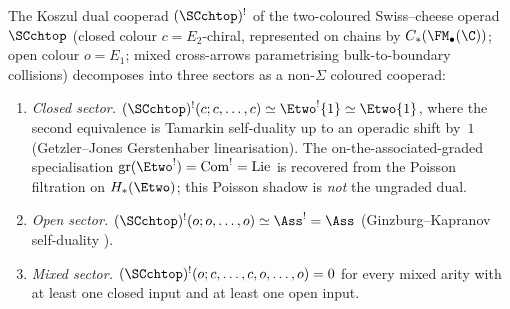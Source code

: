 \begin{proposition}
\label{prop:sc-koszul-dual-three-sectors}
The Koszul dual cooperad $(\SCchtop)^{!}$ of the two-coloured
Swiss--cheese operad $\SCchtop$ (closed colour $c = E_2$-chiral,
represented on chains by $C_\ast(\FM_\bullet(\C))$; open colour
$o = E_1$; mixed cross-arrows parametrising bulk-to-boundary
collisions) decomposes into three sectors as a non-$\Sigma$
coloured cooperad:
\begin{enumerate}[label=\textup{(\roman*)}]
\item \emph{Closed sector.} $(\SCchtop)^{!}(c;c,\ldots,c) \simeq
\Etwo^{!}\{1\} \simeq \Etwo\{1\}$, where the second equivalence
is Tamarkin self-duality \cite{Tam03,LV12} up to an operadic
shift by~$1$ (Getzler--Jones Gerstenhaber linearisation).
The on-the-associated-graded specialisation
$\mathrm{gr}(\Etwo^{!}) = \operatorname{Com}^! = \operatorname{Lie}$
is recovered from the Poisson filtration on $H_\ast(\Etwo)$;
this Poisson shadow is \emph{not} the ungraded dual.
\item \emph{Open sector.} $(\SCchtop)^{!}(o;o,\ldots,o) \simeq
\Ass^{!} = \Ass$ (Ginzburg--Kapranov self-duality
\cite{GK94}).
\item \emph{Mixed sector.} $(\SCchtop)^{!}(o;c,\ldots,c,o,\ldots,o)
= 0$ for every mixed arity with at least one closed input
and at least one open input.
\end{enumerate}
\end{proposition}

